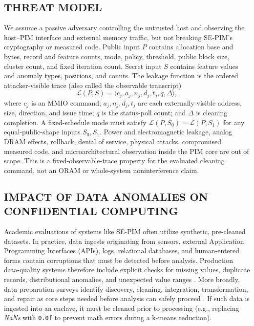 \documentclass[conference]{IEEEtran}
\begin{document}
\subsection{THREAT MODEL}
We assume a passive adversary controlling the untrusted host and observing the
host--PIM interface and external memory traffic, but not breaking SE-PIM's
cryptography or measured code. Public input $P$ contains allocation base and
bytes, record and feature counts, mode, policy, threshold, public block size,
cluster count, and fixed iteration count. Secret input $S$ contains feature
values and anomaly types, positions, and counts. The leakage function is the
ordered attacker-visible trace (also called the observable transcript)
\begin{equation}
 \mathcal{L}(P,S)=\langle c_j,a_j,n_j,d_j,t_j,q,\Delta\rangle,
 \label{eq:leakage}
\end{equation}
where $c_j$ is an MMIO command; $a_j,n_j,d_j,t_j$ are each externally visible
address, size, direction, and issue time; $q$ is the status-poll count; and
$\Delta$ is cleaning completion. A fixed-schedule mode must satisfy
$\mathcal{L}(P,S_0)=\mathcal{L}(P,S_1)$ for any equal-public-shape inputs
$S_0,S_1$. Power and electromagnetic leakage, analog DRAM effects, rollback,
denial of service, physical attacks, compromised measured code, and
microarchitectural observation inside the PIM core are out of scope. This is a
fixed-observable-trace property for the evaluated cleaning command, not an ORAM or
whole-system noninterference claim.

\subsection{IMPACT OF DATA ANOMALIES ON CONFIDENTIAL COMPUTING}
Academic evaluations of systems like SE-PIM often utilize synthetic, pre-cleaned datasets. In practice, data ingests originating from sensors, external Application Programming Interfaces (APIs), logs, relational databases, and human-entered forms contain corruptions that must be detected before analysis. Production data-quality systems therefore include explicit checks for missing values, duplicate records, distributional anomalies, and unexpected value ranges \cite{Schelter:2018}. More broadly, data preparation surveys identify discovery, cleaning, integration, transformation, and repair as core steps needed before analysis can safely proceed \cite{Fernandes:2023}. If such data is ingested into an enclave, it must be cleaned prior to processing (e.g., replacing \textit{NaNs} with \texttt{0.0f} to prevent math errors during a k-means reduction).
\end{document}
